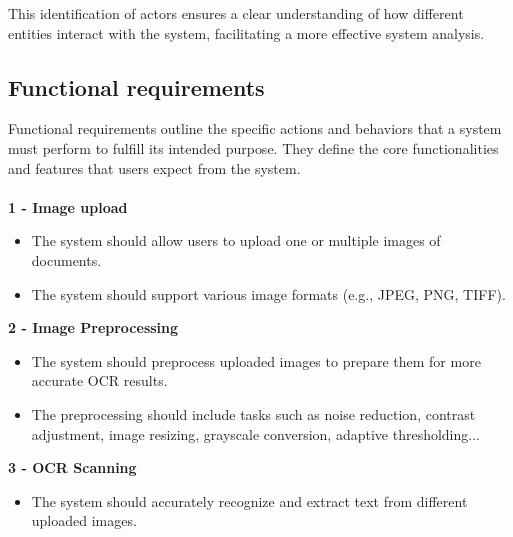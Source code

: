This identification of actors ensures a clear understanding of how different entities interact with the system, facilitating a more effective system analysis.

\subsection{Functional requirements}

Functional requirements outline the specific actions and behaviors that a system must perform to fulfill its intended purpose. They define the core functionalities and features that users expect from the system.\\\\
\textbf{\large 1 - Image upload }
\begin{itemize}
    \item The system should allow users to upload one or multiple images of documents.
    \item The system should support various image formats (e.g., JPEG, PNG, TIFF).
\end{itemize}

\vspace{4mm}

\textbf{\large 2 - Image Preprocessing  }
\begin{itemize}
    \item The system should preprocess uploaded images to prepare them for more accurate OCR results.
    \item The preprocessing should include tasks such as noise reduction, contrast adjustment, image resizing, grayscale conversion, adaptive thresholding...
\end{itemize}
\vspace{4mm}

\textbf{\large 3 - OCR Scanning  }
\begin{itemize}
    \item The system should accurately recognize and extract text from different uploaded images.
\end{itemize}
\vspace{4mm}

